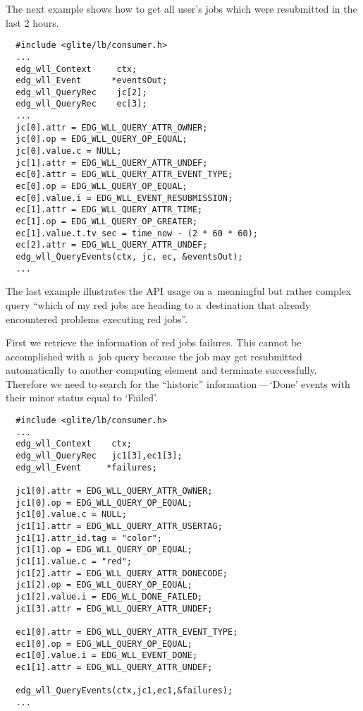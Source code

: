 The next example shows how to get all user's jobs which were resubmitted in the last
2 hours.
\begin{verbatim}
  #include <glite/lb/consumer.h>
  ...
  edg_wll_Context     ctx;    
  edg_wll_Event      *eventsOut;
  edg_wll_QueryRec    jc[2];
  edg_wll_QueryRec    ec[3];
  ...
  jc[0].attr = EDG_WLL_QUERY_ATTR_OWNER;
  jc[0].op = EDG_WLL_QUERY_OP_EQUAL;
  jc[0].value.c = NULL;
  jc[1].attr = EDG_WLL_QUERY_ATTR_UNDEF;
  ec[0].attr = EDG_WLL_QUERY_ATTR_EVENT_TYPE;
  ec[0].op = EDG_WLL_QUERY_OP_EQUAL;
  ec[0].value.i = EDG_WLL_EVENT_RESUBMISSION;
  ec[1].attr = EDG_WLL_QUERY_ATTR_TIME;
  ec[1].op = EDG_WLL_QUERY_OP_GREATER;
  ec[1].value.t.tv_sec = time_now - (2 * 60 * 60);
  ec[2].attr = EDG_WLL_QUERY_ATTR_UNDEF;
  edg_wll_QueryEvents(ctx, jc, ec, &eventsOut);
  ...
\end{verbatim}


The last example illustrates the API usage on
 a~meaningful but rather complex query ``which of my red jobs are heading  
to a~destination that already encountered problems executing red jobs''.

First we retrieve the information of red jobs failures.
This cannot be accomplished with a~job query because the job may
get resubmitted automatically to another computing element and terminate 
successfully. Therefore we need to search for the ``historic''
information\,---\,`Done' events with their minor status
equal to `Failed'.

\begin{verbatim}
  #include <glite/lb/consumer.h>
  ...
  edg_wll_Context    ctx;    
  edg_wll_QueryRec   jc1[3],ec1[3];
  edg_wll_Event     *failures;

  jc1[0].attr = EDG_WLL_QUERY_ATTR_OWNER;
  jc1[0].op = EDG_WLL_QUERY_OP_EQUAL;
  jc1[0].value.c = NULL;
  jc1[1].attr = EDG_WLL_QUERY_ATTR_USERTAG;
  jc1[1].attr_id.tag = "color";
  jc1[1].op = EDG_WLL_QUERY_OP_EQUAL;
  jc1[1].value.c = "red";
  jc1[2].attr = EDG_WLL_QUERY_ATTR_DONECODE;
  jc1[2].op = EDG_WLL_QUERY_OP_EQUAL;
  jc1[2].value.i = EDG_WLL_DONE_FAILED;
  jc1[3].attr = EDG_WLL_QUERY_ATTR_UNDEF;

  ec1[0].attr = EDG_WLL_QUERY_ATTR_EVENT_TYPE;
  ec1[0].op = EDG_WLL_QUERY_OP_EQUAL;
  ec1[0].value.i = EDG_WLL_EVENT_DONE;
  ec1[1].attr = EDG_WLL_QUERY_ATTR_UNDEF;

  edg_wll_QueryEvents(ctx,jc1,ec1,&failures);
  ...
\end{verbatim}

